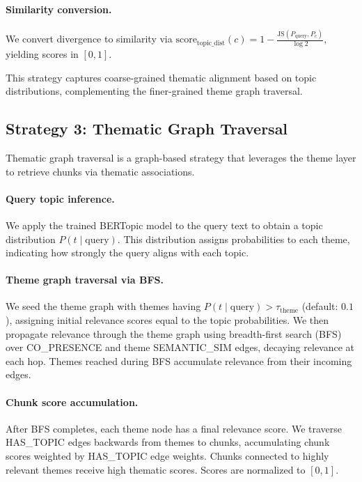 \documentclass[10pt]{article}
\begin{document}
\paragraph{Similarity conversion.} We convert divergence to similarity via $\text{score}_{\text{topic\_dist}}(c) = 1 - \frac{\text{JS}(P_{\text{query}}, P_c)}{\log 2}$, yielding scores in $[0,1]$.

This strategy captures coarse-grained thematic alignment based on topic distributions, complementing the finer-grained theme graph traversal.

\subsection{Strategy 3: Thematic Graph Traversal}

Thematic graph traversal is a graph-based strategy that leverages the theme layer to retrieve chunks via thematic associations.

\paragraph{Query topic inference.} We apply the trained BERTopic model to the query text to obtain a topic distribution $P(t \mid \text{query})$. This distribution assigns probabilities to each theme, indicating how strongly the query aligns with each topic.

\paragraph{Theme graph traversal via BFS.} We seed the theme graph with themes having $P(t \mid \text{query}) > \tau_{\text{theme}}$ (default: $0.1$), assigning initial relevance scores equal to the topic probabilities. We then propagate relevance through the theme graph using breadth-first search (BFS) over CO\_PRESENCE and theme SEMANTIC\_SIM edges, decaying relevance at each hop. Themes reached during BFS accumulate relevance from their incoming edges.

\paragraph{Chunk score accumulation.} After BFS completes, each theme node has a final relevance score. We traverse HAS\_TOPIC edges backwards from themes to chunks, accumulating chunk scores weighted by HAS\_TOPIC edge weights. Chunks connected to highly relevant themes receive high thematic scores. Scores are normalized to $[0,1]$.
\end{document}
